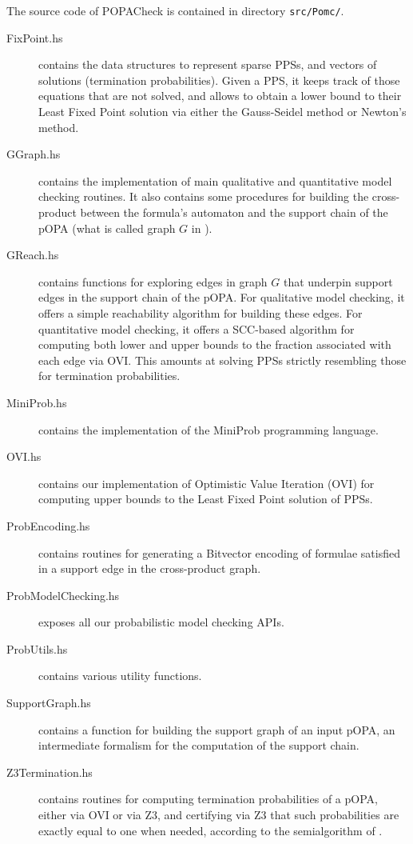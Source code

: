 \documentclass[9pt,a4paper]{article}
\begin{document}
The source code of POPACheck is contained in directory \texttt{src/Pomc/}.
\begin{description}
\item[FixPoint.hs] contains the data structures to represent sparse PPSs, and vectors of solutions (termination probabilities). Given a PPS, it keeps track of those equations that are not solved, and allows to obtain a lower bound to their Least Fixed Point solution via either the Gauss-Seidel method or Newton's method.
\item[GGraph.hs]  contains the implementation of main qualitative and quantitative model checking routines. It also contains some procedures for building the cross-product between the formula's automaton and the support chain of the pOPA (what is called graph $G$ in \cite{abs-2404-03515}).
\item[GReach.hs] contains functions for exploring edges in graph $G$ that underpin support edges in the support chain of the pOPA. For qualitative model checking, it offers a simple reachability algorithm for building these edges. For quantitative model checking, it offers a SCC-based algorithm for computing both lower and upper bounds to the fraction associated with each edge via OVI. This amounts at solving PPSs strictly resembling those for termination probabilities.
\item[MiniProb.hs] contains the implementation of the MiniProb programming language.
\item[OVI.hs] contains our implementation of Optimistic Value Iteration (OVI) for computing upper bounds to the Least Fixed Point solution of PPSs.
\item[ProbEncoding.hs] contains routines for generating a Bitvector encoding of formulae satisfied in a support edge in the cross-product graph.
\item[ProbModelChecking.hs] exposes all our probabilistic model checking APIs.
\item[ProbUtils.hs] contains various utility functions.
\item[SupportGraph.hs] contains a function for building the support graph of an input pOPA, an intermediate formalism for the computation of the support chain.
\item[Z3Termination.hs] contains routines for computing termination probabilities of a pOPA, either via OVI or via Z3, and certifying via Z3 that such probabilities are exactly equal to one when needed, according to the semialgorithm of \cite{POPACheck}.
\end{description}
\end{document}
